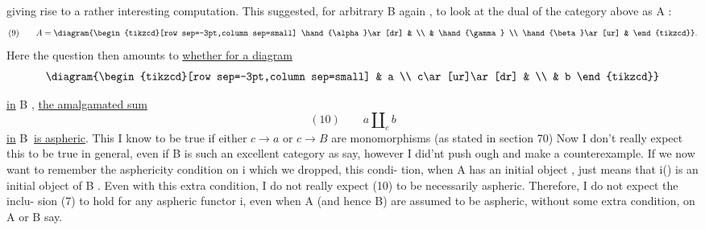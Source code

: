 
giving rise to a rather interesting computation.   This suggested,  for
arbitrary B again ,  to look at the dual of the category above  as A :
\[ (9) \qquad A = \diagram{\begin{tikzcd}[row sep=-3pt,column sep=small] \hand{\alpha}\ar[dr] & \\ & \hand{\gamma} \\ \hand{\beta}\ar[ur] & \end{tikzcd}} . \]
Here the question then amounts to \uline{whether for a diagram}
\[ \diagram{\begin{tikzcd}[row sep=-3pt,column sep=small] & a \\ c\ar[ur]\ar[dr] & \\ & b \end{tikzcd}} \]

\uline{in} B ,  \uline{the amalgamated sum}
\[ (10) \qquad a \amalg_c b \]
\uline{in} B$\hat{\ }$ \uline{is aspheric}.  This I know to be true if either  $c \to a$  or $c \to B$  are
monomorphisms (as stated in section 70)  Now I don't really expect this
\margin{$\times$} to be true in general,  even if B is such an excellent category as \hand{$\Delta$} say,
however I did'nt push ough and make a counterexample.  If we now want
to  remember the asphericity condition on i which we dropped,  this condi-%
tion,  when A has an initial object ,  just means that i() is an initial
object of B .   Even with this extra condition,  I do not really expect
\margin{! $\times$} (10) to be necessarily aspheric.  Therefore,  I do not expect the inclu-%
sion (7) to hold for any aspheric functor i,  even when A (and hence B)
are assumed to be aspheric,  without some extra condition,  on A or B say.

